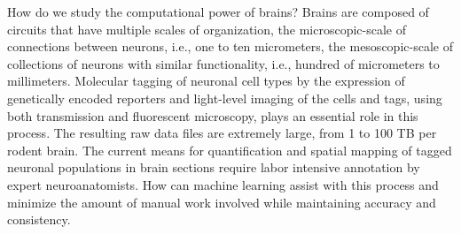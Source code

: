 \documentclass[11pt]{article}
\newcommand{\comment}[3]{{\color{#1} {\bf #2 :} #3}}
\newcommand{\yoav}[1]{\comment{purple}{Yoav}{#1}}
\begin{document}
How do we study the computational power of brains? Brains are composed of circuits that have multiple scales of organization, the microscopic-scale of connections between neurons, i.e., one to ten micrometers, the mesoscopic-scale of collections of neurons with similar functionality, i.e., hundred of micrometers to millimeters. Molecular  tagging of neuronal cell types by the expression of genetically encoded reporters and light-level imaging of the cells and tags, using both transmission and fluorescent microscopy, plays an essential role in this process. The resulting raw data files are extremely large, from 1 to 100 TB per rodent brain. The current means for quantification and spatial mapping of tagged neuronal populations in brain sections require labor intensive annotation by expert neuroanatomists. How can machine learning assist with this process and minimize the amount of manual work involved while maintaining accuracy and consistency.

\end{document}
